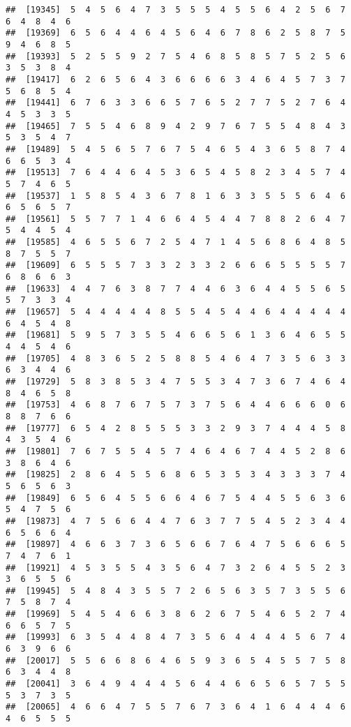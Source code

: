\documentclass[
]{book}
\begin{document}
\begin{verbatim}
##  [19345]  5  4  5  6  4  7  3  5  5  5  4  5  5  6  4  2  5  6  7  6  4  8  4  6
##  [19369]  6  5  6  4  4  6  4  5  6  4  6  7  8  6  2  5  8  7  5  9  4  6  8  5
##  [19393]  5  2  5  5  9  2  7  5  4  6  8  5  8  5  7  5  2  5  6  3  5  3  8  4
##  [19417]  6  2  6  5  6  4  3  6  6  6  6  3  4  6  4  5  7  3  7  5  6  8  5  4
##  [19441]  6  7  6  3  3  6  6  5  7  6  5  2  7  7  5  2  7  6  4  4  5  3  3  5
##  [19465]  7  5  5  4  6  8  9  4  2  9  7  6  7  5  5  4  8  4  3  5  3  5  4  7
##  [19489]  5  4  5  6  5  7  6  7  5  4  6  5  4  3  6  5  8  7  4  6  6  5  3  4
##  [19513]  7  6  4  4  6  4  5  3  6  5  4  5  8  2  3  4  5  7  4  5  7  4  6  5
##  [19537]  1  5  8  5  4  3  6  7  8  1  6  3  3  5  5  5  6  4  6  6  5  6  5  7
##  [19561]  5  5  7  7  1  4  6  6  4  5  4  4  7  8  8  2  6  4  7  5  4  4  5  4
##  [19585]  4  6  5  5  6  7  2  5  4  7  1  4  5  6  8  6  4  8  5  8  7  5  5  7
##  [19609]  6  5  5  5  7  3  3  2  3  3  2  6  6  6  5  5  5  5  7  6  8  6  6  3
##  [19633]  4  4  7  6  3  8  7  7  4  4  6  3  6  4  4  5  5  6  5  5  7  3  3  4
##  [19657]  5  4  4  4  4  4  8  5  5  4  5  4  4  6  4  4  4  4  4  6  4  5  4  8
##  [19681]  5  9  5  7  3  5  5  4  6  6  5  6  1  3  6  4  6  5  5  4  4  5  4  6
##  [19705]  4  8  3  6  5  2  5  8  8  5  4  6  4  7  3  5  6  3  3  6  3  4  4  6
##  [19729]  5  8  3  8  5  3  4  7  5  5  3  4  7  3  6  7  4  6  4  8  4  6  5  8
##  [19753]  4  6  8  7  6  7  5  7  3  7  5  6  4  4  6  6  6  0  6  8  8  7  6  6
##  [19777]  6  5  4  2  8  5  5  5  3  3  2  9  3  7  4  4  4  5  8  4  3  5  4  6
##  [19801]  7  6  7  5  5  4  5  7  4  6  4  6  7  4  4  5  2  8  6  3  8  6  4  6
##  [19825]  2  8  6  4  5  5  6  8  6  5  3  5  3  4  3  3  3  7  4  5  6  5  6  3
##  [19849]  6  5  6  4  5  5  6  6  4  6  7  5  4  4  5  5  6  3  6  5  4  7  5  6
##  [19873]  4  7  5  6  6  4  4  7  6  3  7  7  5  4  5  2  3  4  4  6  5  6  6  4
##  [19897]  4  6  6  3  7  3  6  5  6  6  7  6  4  7  5  6  6  6  5  7  4  7  6  1
##  [19921]  4  5  3  5  5  4  3  5  6  4  7  3  2  6  4  5  5  2  3  3  6  5  5  6
##  [19945]  5  4  8  4  3  5  5  7  2  6  5  6  3  5  7  3  5  5  6  7  5  8  7  4
##  [19969]  5  4  5  4  6  6  3  8  6  2  6  7  5  4  6  5  2  7  4  6  6  5  7  5
##  [19993]  6  3  5  4  4  8  4  7  3  5  6  4  4  4  4  5  6  7  4  6  3  9  6  6
##  [20017]  5  5  6  6  8  6  4  6  5  9  3  6  5  4  5  5  7  5  8  6  3  4  4  8
##  [20041]  3  6  4  9  4  4  4  5  6  4  4  6  6  5  6  5  7  5  5  5  3  7  3  5
##  [20065]  4  6  6  4  7  5  5  7  6  7  3  6  4  1  6  4  4  4  6  4  6  5  5  5

\end{verbatim}
\end{document}
